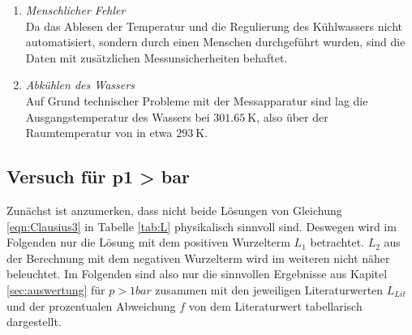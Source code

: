 \begin{enumerate}
  \item \textit{Menschlicher Fehler}\\
    Da das Ablesen der Temperatur und die Regulierung des Kühlwassers nicht automatisiert, sondern durch
    einen Menschen durchgeführt wurden, sind die Daten mit zusätzlichen Messunsicherheiten behaftet.
  \item \textit{Abkühlen des Wassers}\\
    Auf Grund technischer Probleme mit der Messapparatur sind lag die Ausgangstemperatur des Wassers
    bei $\SI{301.65}{\kelvin}$, also über der Raumtemperatur von in etwa $\SI{293}{\kelvin}$.
\end{enumerate}

\subsection{Versuch für p1 > bar}
Zunächst ist anzumerken, dass nicht beide Lösungen von Gleichung \ref{eqn:Clausius3} in Tabelle \ref{tab:L}
physikalisch sinnvoll sind. Deswegen wird im Folgenden nur die Lösung mit dem positiven Wurzelterm $L_1$
betrachtet. $L_2$ aus der Berechnung mit dem negativen Wurzelterm wird im weiteren nicht näher beleuchtet.
Im Folgenden sind also nur die sinnvollen Ergebnisse aus Kapitel \ref{sec:auswertung} für $p>1bar$ zusammen
mit den jeweiligen Literaturwerten $L_{Lit}$ und der prozentualen Abweichung $f$ von dem Literaturwert
tabellarisch dargestellt.
